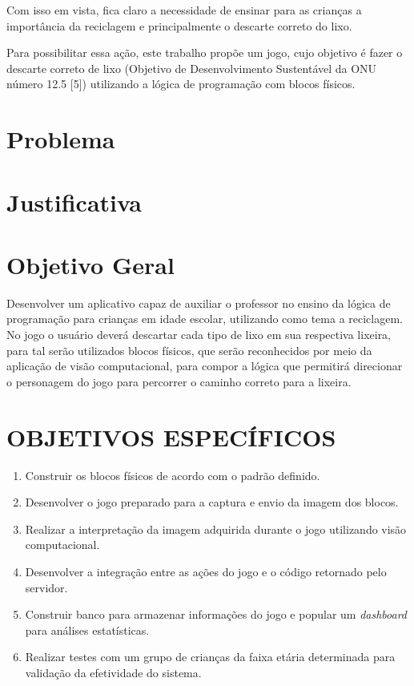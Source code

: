 Com isso em vista, fica claro a necessidade de ensinar para as crianças a importância da reciclagem e principalmente o descarte correto do lixo.

Para possibilitar essa ação, este trabalho propõe um jogo, cujo objetivo é fazer o descarte correto de lixo (Objetivo de Desenvolvimento Sustentável da ONU número 12.5 [5]) utilizando a lógica de programação com blocos físicos.

\section{Problema}

\section{Justificativa}

\section{Objetivo Geral}


Desenvolver um aplicativo capaz de auxiliar o professor no ensino da lógica de programação para crianças em idade escolar, utilizando como tema a reciclagem. No jogo o usuário deverá descartar cada tipo de lixo em sua respectiva lixeira, para tal serão utilizados blocos físicos, que serão reconhecidos por meio da aplicação de visão computacional, para compor a lógica que permitirá direcionar o personagem do jogo para percorrer o caminho correto para a lixeira.

\section{OBJETIVOS ESPECÍFICOS}

\begin{enumerate}
\item Construir os blocos físicos de acordo com o padrão definido.
\item Desenvolver o jogo preparado para a captura e envio da imagem dos blocos.
\item Realizar a interpretação da imagem adquirida durante o jogo utilizando visão computacional.
\item Desenvolver a integração entre as ações do jogo e o código retornado pelo servidor.
\item Construir banco para armazenar informações do jogo e popular um \textit{dashboard} para análises estatísticas.
\item Realizar testes com um grupo de crianças da faixa etária determinada para validação da efetividade do sistema.
\end{enumerate}
